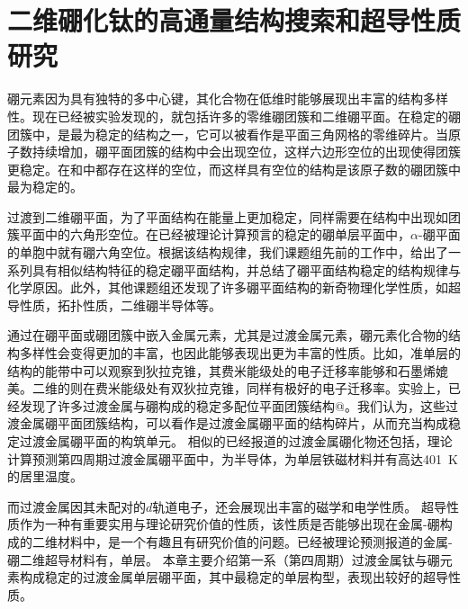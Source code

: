 \chapter{二维硼化钛的高通量结构搜索和超导性质研究}
\newcommand*{\rom}[1]{\uppercase\expandafter{\romannumeral #1\relax}}

硼元素因为具有独特的多中心键，其化合物在低维时能够展现出丰富的结构多样性。现在已经被实验发现的，就包括许多的零维硼团簇和二维硼平面。在稳定的硼团簇中，\cite{kiran2009origin}是最为稳定的结构之一，它可以被看作是平面三角网格的零维碎片。当原子数持续增加，硼平面团簇的结构中会出现空位，这样六边形空位的出现使得团簇更稳定。在和\cite{pham2014boron}中都存在这样的空位，而这样具有空位的结构是该原子数的硼团簇中最为稳定的。

过渡到二维硼平面，为了平面结构在能量上更加稳定，同样需要在结构中出现如团簇平面中的六角形空位。在已经被理论计算预言的稳定的硼单层平面中，$\alpha$-硼平面\cite{yang2008ab}的单胞中就有硼六角空位。根据该结构规律，我们课题组先前的工作中\cite{xu2017practical}，给出了一系列具有相似结构特征的稳定硼平面结构，并总结了硼平面结构稳定的结构规律与化学原因。此外，其他课题组还发现了许多硼平面结构的新奇物理化学性质，如超导性质\cite{penev2016can,zhao2016superconductivity}，拓扑性质\cite{feng2017dirac}，二维硼半导体\cite{xu2017two}等。

通过在硼平面或硼团簇中嵌入金属元素，尤其是过渡金属元素，硼元素化合物的结构多样性会变得更加的丰富，也因此能够表现出更为丰富的性质。比如，准单层的结构的能带中可以观察到狄拉克锥\cite{zhang2014prediction}，其费米能级处的电子迁移率能够和石墨烯媲美。二维的\cite{xie2014first}则在费米能级处有双狄拉克锥，同样有极好的电子迁移率。实验上，已经发现了许多过渡金属与硼构成的稳定多配位平面团簇结构@。我们认为，这些过渡金属硼平面团簇结构，可以看作是过渡金属硼平面的结构碎片，从而充当构成稳定过渡金属硼平面的构筑单元。
相似的已经报道的过渡金属硼化物还包括，理论计算预测第四周期过渡金属硼平面中，\cite{li2016global}为半导体，\cite{li2019room}为单层铁磁材料并有高达\SI{401}{\kelvin}的居里温度。

而过渡金属因其未配对的$d$轨道电子，还会展现出丰富的磁学和电学性质。
超导性质作为一种有重要实用与理论研究价值的性质，该性质是否能够出现在金属-硼构成的二维材料中，是一个有趣且有研究价值的问题。已经被理论预测报道的金属-硼二维超导材料有\cite{yan2019prediction}，单层\cite{wu2016lithium}。
本章主要介绍第一系（第四周期）过渡金属钛与硼元素构成稳定的过渡金属单层硼平面，其中最稳定的单层构型，表现出较好的超导性质。

